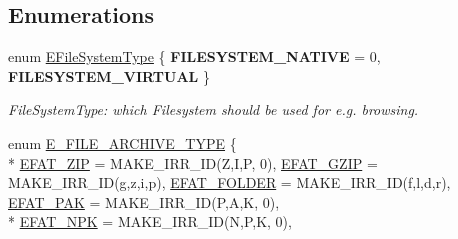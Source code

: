 \subsection*{Enumerations}
\begin{DoxyCompactItemize}
\item 
enum \hyperlink{namespaceirr_1_1io_a22364f1caf06442a70f6198025af3fe9}{E\+File\+System\+Type} \{ {\bfseries F\+I\+L\+E\+S\+Y\+S\+T\+E\+M\+\_\+\+N\+A\+T\+I\+VE} = 0, 
{\bfseries F\+I\+L\+E\+S\+Y\+S\+T\+E\+M\+\_\+\+V\+I\+R\+T\+U\+AL}
 \}\hypertarget{namespaceirr_1_1io_a22364f1caf06442a70f6198025af3fe9}{}\label{namespaceirr_1_1io_a22364f1caf06442a70f6198025af3fe9}
\begin{DoxyCompactList}\small\item\em File\+System\+Type\+: which Filesystem should be used for e.\+g. browsing. \end{DoxyCompactList}
\item 
enum \hyperlink{namespaceirr_1_1io_adb3e3c445ec8e608ed1f0f93306da14f}{E\+\_\+\+F\+I\+L\+E\+\_\+\+A\+R\+C\+H\+I\+V\+E\+\_\+\+T\+Y\+PE} \{ \\*
\hyperlink{namespaceirr_1_1io_adb3e3c445ec8e608ed1f0f93306da14fa63010a52f2efb42f3c85b91ecf077004}{E\+F\+A\+T\+\_\+\+Z\+IP} = M\+A\+K\+E\+\_\+\+I\+R\+R\+\_\+\+ID(\textquotesingle{}Z\textquotesingle{},\textquotesingle{}I\textquotesingle{},\textquotesingle{}P\textquotesingle{}, 0), 
\hyperlink{namespaceirr_1_1io_adb3e3c445ec8e608ed1f0f93306da14fa9d37ff1b229bb63f52d29ef65a35b6ce}{E\+F\+A\+T\+\_\+\+G\+Z\+IP} = M\+A\+K\+E\+\_\+\+I\+R\+R\+\_\+\+ID(\textquotesingle{}g\textquotesingle{},\textquotesingle{}z\textquotesingle{},\textquotesingle{}i\textquotesingle{},\textquotesingle{}p\textquotesingle{}), 
\hyperlink{namespaceirr_1_1io_adb3e3c445ec8e608ed1f0f93306da14fa1d1f159095f087da5647835b47cd85d4}{E\+F\+A\+T\+\_\+\+F\+O\+L\+D\+ER} = M\+A\+K\+E\+\_\+\+I\+R\+R\+\_\+\+ID(\textquotesingle{}f\textquotesingle{},\textquotesingle{}l\textquotesingle{},\textquotesingle{}d\textquotesingle{},\textquotesingle{}r\textquotesingle{}), 
\hyperlink{namespaceirr_1_1io_adb3e3c445ec8e608ed1f0f93306da14faae9e1788acfc49c30a77f80f5ced7cf5}{E\+F\+A\+T\+\_\+\+P\+AK} = M\+A\+K\+E\+\_\+\+I\+R\+R\+\_\+\+ID(\textquotesingle{}P\textquotesingle{},\textquotesingle{}A\textquotesingle{},\textquotesingle{}K\textquotesingle{}, 0), 
\\*
\hyperlink{namespaceirr_1_1io_adb3e3c445ec8e608ed1f0f93306da14fafcb0e1222939f010af78f15556f4fe07}{E\+F\+A\+T\+\_\+\+N\+PK} = M\+A\+K\+E\+\_\+\+I\+R\+R\+\_\+\+ID(\textquotesingle{}N\textquotesingle{},\textquotesingle{}P\textquotesingle{},\textquotesingle{}K\textquotesingle{}, 0), 

\end{DoxyCompactItemize}
